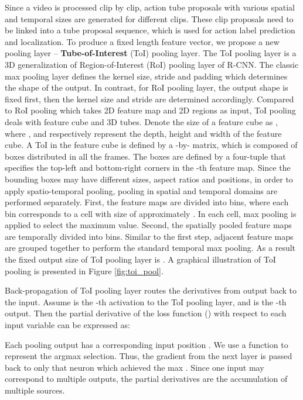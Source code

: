 \documentclass[10pt,twocolumn,letterpaper]{article}
\begin{document}
Since a video is processed clip by clip, action tube proposals with various spatial and temporal sizes are generated for different clips. These clip proposals need to be linked into a  tube proposal sequence, which  is used for action label prediction and localization. To produce a fixed length feature vector, we propose a new pooling layer -- {\bf Tube-of-Interest} (ToI) pooling layer. The ToI pooling layer is a 3D generalization of Region-of-Interest (RoI) pooling layer of R-CNN. The classic max pooling layer defines the kernel size, stride and padding which determines the shape of the output. In contrast, for RoI pooling layer, the output shape is fixed first, then the kernel size and stride are determined accordingly. Compared to RoI pooling which takes 2D feature map and 2D regions as input, ToI pooling deals with feature cube and  3D tubes. Denote the size of a feature cube as , where ,  and  respectively represent the depth, height and width of the feature cube. A ToI in the feature cube is defined by a -by- matrix, which is composed of  boxes distributed in all the frames. The boxes are defined by a four-tuple  that specifies the top-left and bottom-right corners in the -th feature map. Since the  bounding boxes may have different sizes, aspect ratios and positions, in order to apply spatio-temporal pooling, pooling in spatial and  temporal domains are performed separately. First, the  feature maps are divided  into  bins, where each bin corresponds to a cell with size of approximately . In each cell, max pooling is applied to select the maximum value. Second, the spatially pooled  feature maps are temporally divided into  bins. Similar to the first step,  adjacent feature maps are grouped together to perform the standard temporal max pooling.  As a result the fixed output size of ToI pooling layer is . A graphical illustration of ToI pooling is presented in Figure \ref{fig:toi_pool}.

Back-propagation of ToI pooling layer routes the derivatives from output back to the input. Assume  is the -th activation to the ToI pooling layer, and  is the -th output. Then the partial derivative of the loss function () with respect to each input variable  can be expressed as:

Each pooling output  has a corresponding input position . We use a function  to represent the argmax selection. Thus, the gradient from the next layer  is passed back to only that neuron which achieved the max . Since one input may correspond to multiple outputs, the partial derivatives are the accumulation of multiple sources.
\end{document}
